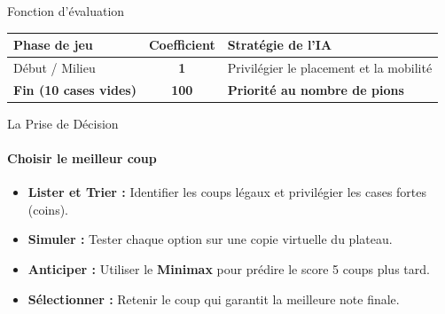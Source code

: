 \documentclass[10pt, aspectratio=169]{beamer}
\begin{document}
\begin{frame}{Fonction d'évaluation}
    \centering
    \small
    \begin{tabular}{|l|c|l|}
        \hline
        \rowcolor{Wood!40} \textbf{Phase de jeu} & \textbf{Coefficient} & \textbf{Stratégie de l'IA} \\ \hline
        Début / Milieu & \textbf{1} & Privilégier le placement et la mobilité \\ \hline
        \rowcolor{DarkPink!20} \textbf{Fin (10 cases vides)} & \textbf{100} & \textbf{Priorité au nombre de pions} \\ \hline
    \end{tabular}
\end{frame}

\begin{frame}{La Prise de Décision}
    \framesubtitle{Choisir le meilleur coup}

    \vspace{0.3cm}
    \begin{itemize}
        \item \textbf{Lister et Trier :} Identifier les coups légaux et privilégier les cases fortes (coins).
        \vspace{0.8cm}
        \item \textbf{Simuler :} Tester chaque option sur une copie virtuelle du plateau.
        \vspace{0.8cm}
        \item \textbf{Anticiper :} Utiliser le \textbf{Minimax} pour prédire le score 5 coups plus tard.
        \vspace{0.8cm}
        \item \textbf{Sélectionner :} Retenir le coup qui garantit la meilleure note finale.
    \end{itemize}
\end{frame}
\end{document}
